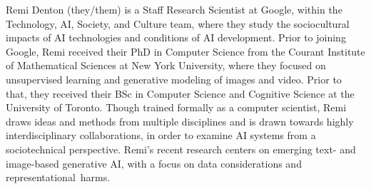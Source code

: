 Remi Denton (they/them) is a Staff Research Scientist at Google, within the Technology, AI, Society, and Culture team, where they study the sociocultural impacts of AI technologies and conditions of AI development. Prior to joining Google, Remi received their PhD in Computer Science from the Courant Institute of Mathematical Sciences at New York University, where they focused on unsupervised learning and generative modeling of images and video. Prior to that, they received their BSc in Computer Science and Cognitive Science at the University of Toronto. Though trained formally as a computer scientist, Remi draws ideas and methods from multiple disciplines and is drawn towards highly interdisciplinary collaborations, in order to examine AI systems from a sociotechnical perspective.  Remi’s recent research centers on emerging text- and image-based generative AI, with a focus on data considerations and representational harms.